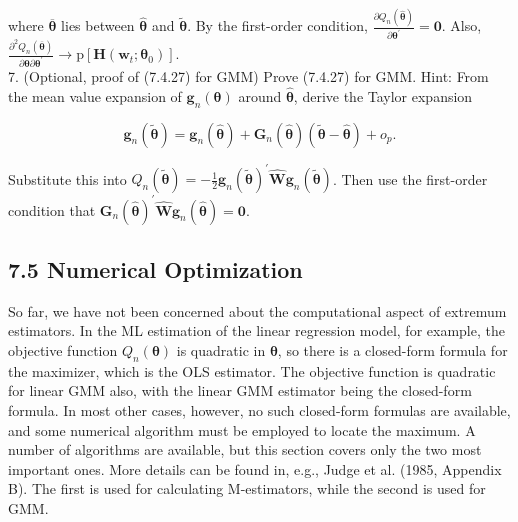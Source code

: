 \documentclass[10pt]{article}
\begin{document}
where $\overline{\boldsymbol{\theta}}$ lies between $\hat{\boldsymbol{\theta}}$ and $\tilde{\boldsymbol{\theta}}$. By the first-order condition, $\frac{\partial Q_{n}(\hat{\boldsymbol{\theta}})}{\partial \boldsymbol{\theta}^{\prime}}=\mathbf{0}$. Also, $\frac{\partial^{2} Q_{n}(\overline{\boldsymbol{\theta}})}{\partial \boldsymbol{\theta} \partial \boldsymbol{\theta}^{\prime}} \rightarrow \mathrm{p}\left[\mathbf{H}\left(\mathbf{w}_{t} ; \boldsymbol{\theta}_{0}\right)\right]$.\\
7. (Optional, proof of (7.4.27) for GMM) Prove (7.4.27) for GMM. Hint: From the mean value expansion of $\mathbf{g}_{n}(\boldsymbol{\theta})$ around $\hat{\boldsymbol{\theta}}$, derive the Taylor expansion


\begin{equation*}
\mathbf{g}_{n}(\tilde{\boldsymbol{\theta}})=\mathbf{g}_{n}(\hat{\boldsymbol{\theta}})+\mathbf{G}_{n}(\hat{\boldsymbol{\theta}})(\tilde{\boldsymbol{\theta}}-\hat{\boldsymbol{\theta}})+o_{p} . \tag{7.4.33}
\end{equation*}


Substitute this into $Q_{n}(\tilde{\boldsymbol{\theta}})=-\frac{1}{2} \mathbf{g}_{n}(\tilde{\boldsymbol{\theta}})^{\prime} \widehat{\mathbf{W}} \mathbf{g}_{n}(\tilde{\boldsymbol{\theta}})$. Then use the first-order condition that $\mathbf{G}_{n}(\hat{\boldsymbol{\theta}})^{\prime} \widehat{\mathbf{W}} \mathbf{g}_{n}(\hat{\boldsymbol{\theta}})=\mathbf{0}$.

\subsection*{7.5 Numerical Optimization}
So far, we have not been concerned about the computational aspect of extremum estimators. In the ML estimation of the linear regression model, for example, the objective function $Q_{n}(\boldsymbol{\theta})$ is quadratic in $\boldsymbol{\theta}$, so there is a closed-form formula for the maximizer, which is the OLS estimator. The objective function is quadratic for linear GMM also, with the linear GMM estimator being the closed-form formula. In most other cases, however, no such closed-form formulas are available, and some numerical algorithm must be employed to locate the maximum. A number of algorithms are available, but this section covers only the two most important ones. More details can be found in, e.g., Judge et al. (1985, Appendix B). The first is used for calculating M-estimators, while the second is used for GMM.
\end{document}
